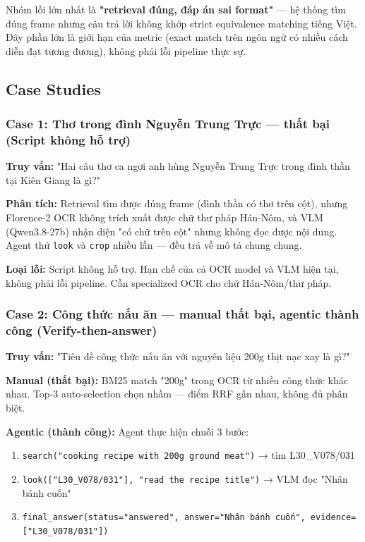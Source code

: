 \documentclass[12pt,a4paper,onecolumn]{article}
\begin{document}
Nhóm lỗi lớn nhất là \textbf{"retrieval đúng, đáp án sai format"} — hệ thống tìm đúng frame nhưng câu trả lời không khớp strict equivalence matching tiếng Việt. Đây phần lớn là giới hạn của metric (exact match trên ngôn ngữ có nhiều cách diễn đạt tương đương), không phải lỗi pipeline thực sự.

\subsection{Case Studies}

\subsubsection{Case 1: Thơ trong đình Nguyễn Trung Trực — thất bại (Script không hỗ trợ)}

\textbf{Truy vấn:} "Hai câu thơ ca ngợi anh hùng Nguyễn Trung Trực trong đình thần tại Kiên Giang là gì?"

\textbf{Phân tích:} Retrieval tìm được đúng frame (đình thần có thơ trên cột), nhưng Florence-2 OCR không trích xuất được chữ thư pháp Hán-Nôm, và VLM (Qwen3.8-27b) nhận diện "có chữ trên cột" nhưng không đọc được nội dung. Agent thử \texttt{look} và \texttt{crop} nhiều lần — đều trả về mô tả chung chung.

\textbf{Loại lỗi:} Script không hỗ trợ. Hạn chế của cả OCR model và VLM hiện tại, không phải lỗi pipeline. Cần specialized OCR cho chữ Hán-Nôm/thư pháp.

\subsubsection{Case 2: Công thức nấu ăn — manual thất bại, agentic thành công (Verify-then-answer)}

\textbf{Truy vấn:} "Tiêu đề công thức nấu ăn với nguyên liệu 200g thịt nạc xay là gì?"

\textbf{Manual (thất bại):} BM25 match "200g" trong OCR từ nhiều công thức khác nhau. Top-3 auto-selection chọn nhầm — điểm RRF gần nhau, không đủ phân biệt.

\textbf{Agentic (thành công):} Agent thực hiện chuỗi 3 bước:

\begin{enumerate}
  \item \texttt{search("cooking recipe with 200g ground meat")} → tìm L30\_V078/031
  \item \texttt{look(["L30\_V078/031"], "read the recipe title")} → VLM đọc "Nhân bánh cuốn"
  \item \texttt{final\_answer(status="answered", answer="Nhân bánh cuốn", evidence=["L30\_V078/031"])}
\end{enumerate}
\end{document}

